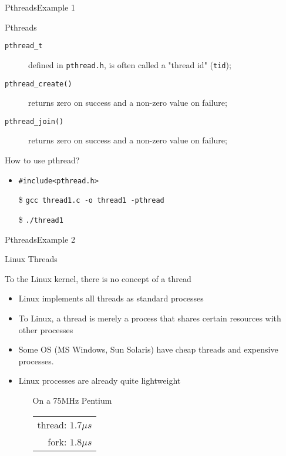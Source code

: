 \begin{frame}{Pthreads}{Example 1}
  \centering
\end{frame}

\begin{frame}{Pthreads}
  \begin{description}
  \item[\texttt{pthread\_t}] defined in \texttt{pthread.h}, is often called a "thread id"
    (\texttt{tid});
  \item[\texttt{pthread\_create()}] returns zero on success and a non-zero value on failure;
  \item[\texttt{pthread\_join()}] returns zero on success and a non-zero value on failure;
  \end{description}
  \begin{iblock}{How to use pthread?}
    \begin{itemize}
    \item \texttt{\#include<pthread.h>}
    \item[\$] \texttt{gcc thread1.c -o thread1 -pthread}
    \item[\$] \texttt{./thread1}
    \end{itemize}
  \end{iblock}
\end{frame}

\begin{frame}{Pthreads}{Example 2}
  \centering
\end{frame}

\begin{frame}{Linux Threads}
  \begin{block}{To the Linux kernel, there is no concept of a thread}
    \begin{itemize}
    \item Linux implements all threads as standard processes
    \item To Linux, a thread is merely a process that shares certain resources with other
      processes
    \item Some OS (MS Windows, Sun Solaris) have cheap threads and expensive processes.
    \item Linux processes are already quite lightweight
      \begin{itemize}
      \item[] On a 75MHz Pentium
        \begin{tabular}{r}
          thread: $1.7\mu{}s$\\
          fork: $1.8\mu{}s$
        \end{tabular}
      \end{itemize}
    \end{itemize}
  \end{block}
\end{frame}

